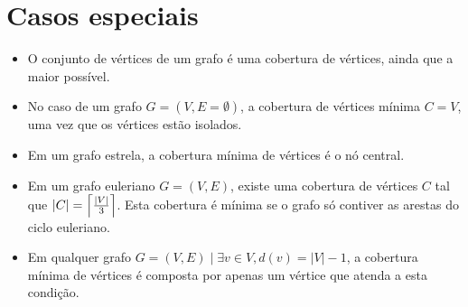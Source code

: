 \section{Casos especiais}
\label{sec:casos-especiais}

\begin{itemize}
    \item O conjunto de vértices de um grafo é uma cobertura de
    vértices, ainda que a maior possível.

    \item No caso de um grafo $G = (V, E=\emptyset)$, a cobertura de vértices
    mínima $C = V$, uma vez que os vértices estão isolados.

    \item Em um grafo estrela, a cobertura mínima de vértices é o nó
    central.

    \item Em um grafo euleriano $G = (V, E)$,  existe uma cobertura de
    vértices $C$ tal que $\left| C \right| = \left \lceil {\left| V \right|
        \over 3} \right \rceil$. Esta cobertura é mínima se o grafo só
        contiver as arestas do ciclo euleriano.

    \item Em qualquer grafo $G = (V, E) \mid \exists v \in V, d(v) =
    \left| V \right| - 1$, a cobertura mínima de vértices é composta
    por apenas um vértice que atenda a esta condição.
\end{itemize}
